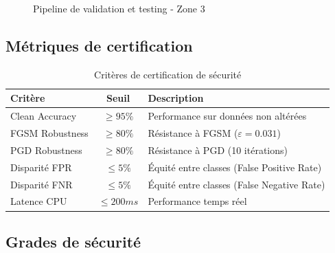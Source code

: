 \documentclass[11pt,a4paper]{article}
\begin{document}
\begin{figure}[h!]
\caption{Pipeline de validation et testing - Zone 3}
\label{fig:zone3_validation}
\end{figure}

\subsection{Métriques de certification}

\begin{table}[h!]
\centering
\caption{Critères de certification de sécurité}
\label{tab:zone3_certification}
\begin{tabularx}{\textwidth}{|l|c|X|}
\hline
\textbf{Critère} & \textbf{Seuil} & \textbf{Description} \\ \hline
Clean Accuracy & $\geq 95\%$ & Performance sur données non altérées \\ \hline
FGSM Robustness & $\geq 80\%$ & Résistance à FGSM ($\varepsilon=0.031$) \\ \hline
PGD Robustness & $\geq 80\%$ & Résistance à PGD (10 itérations) \\ \hline
Disparité FPR & $\leq 5\%$ & Équité entre classes (False Positive Rate) \\ \hline
Disparité FNR & $\leq 5\%$ & Équité entre classes (False Negative Rate) \\ \hline
Latence CPU & $\leq 200ms$ & Performance temps réel \\ \hline
\end{tabularx}
\end{table}

\subsection{Grades de sécurité}
\end{document}
